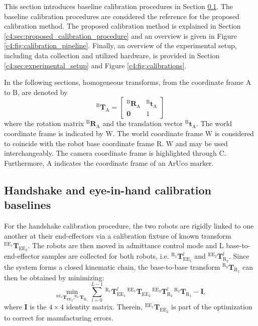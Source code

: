 This section introduces baseline calibration procedures in Section \ref{c4:sec:handshake_and_eye_in_hand_calibration}. The baseline calibration procedures are considered the reference for the proposed calibration method. The proposed calibration method is explained in Section \ref{c4:sec:proposed_calibration_procedure} and an overview is given in Figure \ref{c4:fig:calibration_pipeline}. Finally, an overview of the experimental setup, including data collection and utilized hardware, is provided in Section \ref{c4:sec:experimental_setup} and Figure \ref{c4:fig:calibrations}.

In the following sections, homogeneous transforms, from the coordinate frame $\text{A}$ to $\text{B}$, are denoted by $$^\text{B}\mathbf{T}_\text{A}=\begin{bmatrix} ^\text{B}\mathbf{R}_\text{A} & ^\text{B}\textbf{t}_\text{A} \\ \mathbf{0} & 1 \end{bmatrix}$$ where the rotation matrix $^\text{B}\mathbf{R}_\text{A}$ and the translation vector $^\text{B}\textbf{t}_\text{A}$. The world coordinate frame is indicated by $\text{W}$. The world coordinate frame $\text{W}$ is considered to coincide with the robot base coordinate frame $\text{R}$. $\text{W}$ and  may be used interchangeably. The camera coordinate frame is highlighted through $\text{C}$. Furthermore, $\text{A}$ indicates the coordinate frame of an ArUco marker.

\subsection{Handshake and eye-in-hand calibration baselines}
\label{c4:sec:handshake_and_eye_in_hand_calibration}
For the handshake calibration procedure, the two robots are rigidly linked to one another at their end-effectors via a calibration fixture of known transform $^{\text{EE}_1}\mathbf{T}_{\text{EE}_2}$. The robots are then moved in admittance control mode and L base-to-end-effector samples are collected for both robots, i.e. $^{\text{R}_1}\mathbf{T}^l_{\text{EE}_1}$ and $^{\text{EE}_2}\mathbf{T}^l_{\text{R}_2}$. Since the system forms a closed kinematic chain, the base-to-base transform $^{\text{R}_2}\mathbf{T}_{\text{R}_1}$ can then be obtained by minimizing:
%
\begin{equation}
    \label{c4:eq:handsake}
    \min_{^{\text{EE}_1}\mathbf{T}_{\text{EE}_2}, ^{\text{R}_2}\mathbf{T}_{\text{R}_1}} \sum_{l=0}^{L-1}\,^{\text{R}_1}\mathbf{T}^l_{\text{EE}_1}\,^{\text{EE}_1}\mathbf{T}_{\text{EE}_2}\,^{\text{EE}_2}\mathbf{T}^l_{\text{R}_2}\,^{\text{R}_2}\mathbf{T}_{\text{R}_1} - \mathbf{I},
\end{equation}
%
where $\mathbf{I}$ is the $4\times4$ identity matrix. Therein, $^{\text{EE}_1}\mathbf{T}_{\text{EE}_2}$ is part of the optimization to correct for manufacturing errors.

